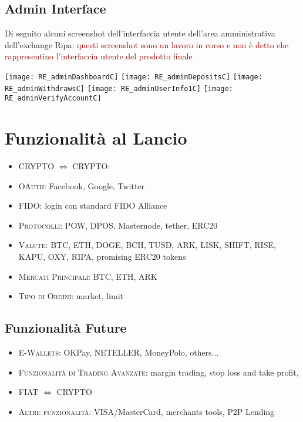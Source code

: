 \documentclass[11pt,fleqn,oneside]{book} %
\begin{document}
\subsection{Admin Interface}
Di seguito alcuni screenshot dell'interfaccia utente dell'area amministrativa dell'exchange Ripa:
\textcolor{darkred}{questi screenshot sono un lavoro in corso e non è detto che rappresentino l'interfaccia utente del prodotto finale}\\
\begin{center}
	\texttt{[image: RE\_adminDashboardC]}
	\texttt{[image: RE\_adminDepositsC]}
	\texttt{[image: RE\_adminWithdrawsC]}
	\texttt{[image: RE\_adminUserInfo1C]}
	\texttt{[image: RE\_adminVerifyAccountC]}
\end{center}

\section{Funzionalità al Lancio}
\begin{itemize}
	\item \textsc{\textsc{CRYPTO $\Leftrightarrow$ CRYPTO}}:
	\item \textsc{\textsc{OAuth}}: Facebook, Google, Twitter
	\item \textsc{\textsc{FIDO}}: login con standard FIDO Alliance
	\item \textsc{\textsc{Protocolli}}: POW, DPOS, Masternode, tether, ERC20
	\item \textsc{\textsc{Valute}}: BTC, ETH, DOGE, BCH, TUSD, ARK, LISK, SHIFT, RISE, KAPU, OXY, RIPA, promising ERC20 tokens
	\item \textsc{\textsc{Mercati Principali}}: BTC, ETH, ARK
	\item \textsc{\textsc{Tipo di Ordini}}: market, limit
\end{itemize}

\subsection{Funzionalità Future}
\begin{itemize}
	\item \textsc{\textsc{E-Wallets}}: OKPay, NETELLER, MoneyPolo, others...
	\item \textsc{\textsc{Funzionalità di Trading Avanzate}}: margin trading, stop loss and take profit, 
	\item \textsc{\textsc{FIAT $\Leftrightarrow$ CRYPTO}}
	\item \textsc{\textsc{Altre funzionalità}}: VISA/MasterCard, merchants tools, P2P Lending 
\end{itemize}
\end{document}
